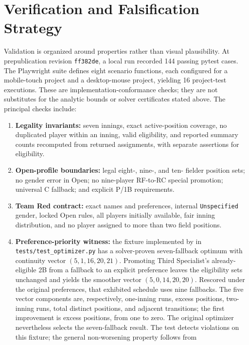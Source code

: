 \documentclass[11pt]{article}
\newcommand{\code}[1]{\texttt{#1}}
\begin{document}
\section{Verification and Falsification Strategy}

Validation is organized around properties rather than visual plausibility.
At prepublication revision \code{ff382de}, a local run recorded 144 passing
pytest cases. The Playwright suite defines eight scenario functions, each
configured for a mobile-touch project and a desktop-mouse project, yielding 16
project-test executions. These are implementation-conformance checks; they are
not substitutes for the analytic bounds or solver certificates stated above.
The principal checks include:
\begin{enumerate}
    \item \textbf{Legality invariants:} seven innings, exact active-position
    coverage, no duplicated player within an inning, valid eligibility, and
    reported summary counts recomputed from returned assignments, with separate
    assertions for eligibility.
    \item \textbf{Open-profile boundaries:} legal eight-, nine-, and ten-
    fielder position sets; no gender error in Open; no nine-player RF-to-RC
    special promotion; universal C fallback; and explicit P/1B requirements.
    \item \textbf{Team Red contract:} exact names and preferences, internal
    \code{Unspecified} gender, locked Open rules, all players initially
    available, fair inning distribution, and no player assigned to more than
    two field positions.
    \item \textbf{Preference-priority witness:} the fixture implemented by
    in \code{tests/test\_optimizer.py} has a
    solver-proven seven-fallback optimum with continuity vector
    $(5,1,16,20,21)$. Promoting Third Specialist's already-eligible 2B from a
    fallback to an explicit preference leaves the eligibility sets unchanged
    and yields the smoother vector $(5,0,14,20,20)$. Rescored under the original
    preferences, that exhibited schedule uses nine fallbacks. The five vector
    components are, respectively, one-inning runs, excess positions,
    two-inning runs, total distinct positions, and adjacent transitions; the
    first improvement is excess positions, from one to zero. The original
    optimizer nevertheless selects the seven-fallback result. The test detects
    violations on this fixture; the general non-worsening property follows from

\end{enumerate}
\end{document}

